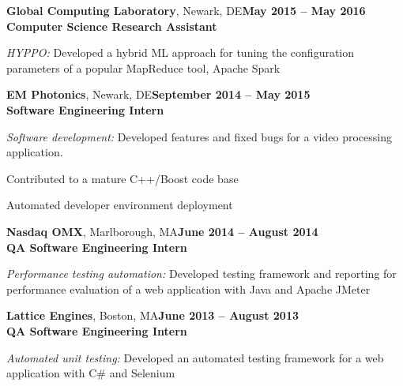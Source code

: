 \documentclass[10pt,margin,line]{resume}
\begin{document}
\begin{resume}
\begin{small}
\textbf{Global Computing Laboratory}, Newark, DE\hfill\textbf{May 2015 -- May 2016}\\
\textbf{Computer Science Research Assistant}\hfill 
\vspace{-3mm}\\\vspace{-1mm}
\begin{list2}
	\item \filbreak\textit{HYPPO:} Developed a hybrid ML approach for tuning the
    configuration parameters of a popular MapReduce tool, Apache Spark
\end{list2}

\textbf{EM Photonics}, Newark, DE\hfill\textbf{September 2014 -- May 2015}\\
\textbf{Software Engineering Intern}\hfill 
\vspace{-3mm}\\\vspace{-1mm}
\begin{list2}
	\item \filbreak\textit{Software development:} Developed features and fixed bugs for a video processing application.
    \item \filbreak Contributed to a mature C++/Boost code base
    \item \filbreak Automated developer environment deployment
\end{list2}

\textbf{Nasdaq OMX}, Marlborough, MA\hfill\textbf{June 2014 -- August 2014}\\
\textbf{QA Software Engineering Intern}\hfill 
\vspace{-3mm}\\\vspace{-1mm}
\begin{list2}
	\item \filbreak\textit{Performance testing automation:} Developed testing framework and reporting
    for performance evaluation of a web application with Java and Apache JMeter
\end{list2}

\textbf{Lattice Engines}, Boston, MA\hfill\textbf{June 2013 -- August 2013}\\
\textbf{QA Software Engineering Intern}\hfill 
\vspace{-3mm}\\\vspace{-1mm}
\begin{list2}
	\item \filbreak\textit{Automated unit testing:} Developed an automated testing framework
    for a web application with C\# and Selenium
\end{list2}


\end{small}
\end{resume}
\end{document}
